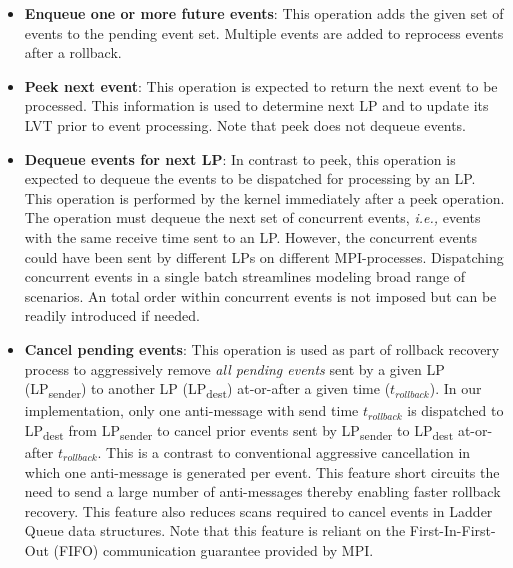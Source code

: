 \begin{itemize}
\item[\ding{182}] \textbf{Enqueue one or more future events}: This operation adds the given set of events to the pending event set. Multiple events are added to reprocess events after a rollback.	 

\item[\ding{183}] \textbf{Peek next event}: This operation is expected to return the next event to be processed.  This information is used to determine next LP and to update its LVT prior to event processing. Note that peek does not dequeue events.

\item[\ding{184}] \textbf{Dequeue events for next LP}: In contrast to peek, this operation is expected to dequeue the events to be dispatched for processing by an LP. This operation is performed by the kernel immediately after a peek operation. The operation must dequeue the next set of concurrent events, \textit{i.e.,} events with the same receive time sent to an LP. However, the concurrent events could have been sent by different LPs on different MPI-processes.
Dispatching concurrent events in a single batch streamlines modeling broad range of scenarios. An total order within concurrent events is not imposed but can be readily introduced if needed.	

\item[\ding{185}] \textbf{Cancel pending events}: This operation is used as part of rollback recovery process to aggressively remove \emph{all pending events} sent by a given LP (LP\textsubscript{sender}) to another LP (LP\textsubscript{dest}) at-or-after a given time ($t_{rollback}$). In our implementation, only one anti-message with send time $t_{rollback}$ is dispatched to LP\textsubscript{dest} from LP\textsubscript{sender} to cancel prior events sent by LP\textsubscript{sender} to LP\textsubscript{dest} at-or-after $t_{rollback}$. This is a contrast to conventional aggressive cancellation in which one anti-message is generated per event. This feature short circuits the need to send a large number of anti-messages thereby enabling faster rollback recovery. This feature also reduces scans required to cancel events in Ladder Queue data structures. Note that this feature is reliant on the First-In-First-Out (FIFO) communication guarantee provided by MPI.
\end{itemize}   

